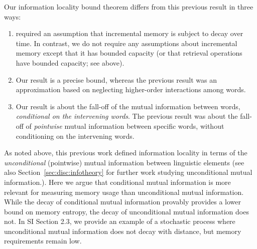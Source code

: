 Our information locality bound theorem differs from this previous result in three ways:
\begin{enumerate}
    \item \citet{futrell2020lossy} required an assumption that incremental memory is subject to decay over time. In contrast, we do not require any assumptions about incremental memory except that it has bounded capacity (or that retrieval operations have bounded capacity; see above).
    \item Our result is a precise bound, whereas the previous result was an approximation based on neglecting higher-order interactions among words.
    \item Our result is about the fall-off of the mutual information between words, \emph{conditional on the intervening words}. The previous result was about the fall-off of \emph{pointwise} mutual information between specific words, without conditioning on the intervening words.
\end{enumerate}

As noted above, this previous work defined information locality in terms of the \emph{unconditional} (pointwise) mutual information between linguistic elements (see also Section~\ref{sec:disc:infotheory} for further work studying unconditional mutual information.). 
Here we argue that conditional mutual information is more relevant for measuring memory usage than unconditional mutual information. 
While the decay of conditional mutual information provably provides a lower bound on memory entropy, the decay of unconditional mutual information does not.
In SI Section 2.3, we provide an example of a stochastic process where unconditional mutual information does not decay with distance, but memory requirements remain low.







